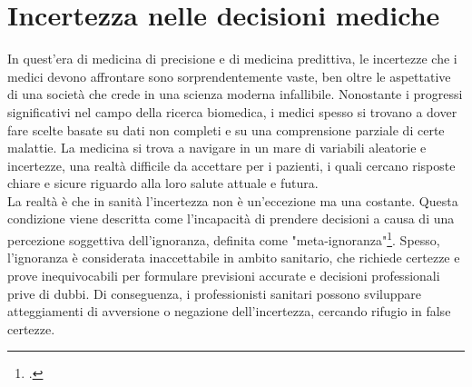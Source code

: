 \chapter{Incertezza nelle decisioni mediche}
\label{cap:incertezza-decisioni-mediche}

In quest'era di medicina di precisione e di medicina predittiva, le incertezze che i medici devono affrontare sono sorprendentemente vaste, ben oltre le aspettative di una società che crede in una scienza moderna infallibile. Nonostante i progressi significativi nel campo della ricerca biomedica, i medici spesso si trovano a dover fare scelte basate su dati non completi e su una comprensione parziale di certe malattie. La medicina si trova a navigare in un mare di variabili aleatorie e incertezze, una realtà difficile da accettare per i pazienti, i quali cercano risposte chiare e sicure riguardo alla loro salute attuale e futura.\\
La realtà è che in sanità l'incertezza non è un'eccezione ma una costante. Questa condizione viene descritta come l'incapacità di prendere decisioni a causa di una percezione soggettiva dell'ignoranza, definita come "meta-ignoranza"\footcite{womak:meta-ignoranza}. Spesso, l'ignoranza è considerata inaccettabile in ambito sanitario, che richiede certezze e prove inequivocabili per formulare previsioni accurate e decisioni professionali prive di dubbi. Di conseguenza, i professionisti sanitari possono sviluppare atteggiamenti di avversione o negazione dell'incertezza, cercando rifugio in false certezze.\\

